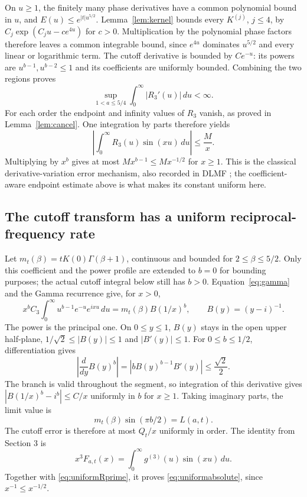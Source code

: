 \documentclass[11pt]{article}
\theoremstyle{remark}\newtheorem{remark}[theorem]{Remark}
\begin{document}
On $u\geq1$, the finitely many phase derivatives have a common
polynomial bound in $u$, and $E(u)\leq e^{|t|u^{5/2}}$.
Lemma~\ref{lem:kernel} bounds every $K^{(j)}$, $j\leq4$, by
$C_j\exp(C_ju-c e^{4u})$ for $c>0$. Multiplication by the
polynomial phase factors therefore leaves a common integrable
bound, since $e^{4u}$ dominates $u^{5/2}$ and every linear or
logarithmic term. The cutoff derivative is bounded by $Ce^{-u}$:
its powers are $u^{b-1},u^{b-2}\leq1$ and its coefficients are
uniformly bounded. Combining the two regions proves
\begin{equation}\label{eq:uniformRprime}
 \sup_{1<a\leq5/4}\int_0^\infty|R_3'(u)|\,du<\infty.
\end{equation}
For each order the endpoint and infinity values of $R_3$ vanish,
as proved in Lemma~\ref{lem:cancel}. One integration by parts
therefore yields
\[
 \left|\int_0^\infty R_3(u)\sin(xu)\,du\right|\leq\frac Mx.
\]
Multiplying by $x^b$ gives at most
$Mx^{b-1}\leq Mx^{-1/2}$ for $x\geq1$.
This is the classical derivative-variation error mechanism, also
recorded in DLMF \cite[\S2.3(i)]{DLMF}; the coefficient-aware
endpoint estimate above is what makes its constant uniform here.

\subsection*{The cutoff transform has a uniform reciprocal-frequency rate}
Let $m_t(\beta)=tK(0)\Gamma(\beta+1)$, continuous and bounded
for $2\leq\beta\leq5/2$. Only this coefficient and the power profile are extended to $b=0$ for bounding purposes; the actual cutoff integral below still has $b>0$. Equation~\eqref{eq:gamma} and the
Gamma recurrence give, for $x>0$,
\[
 x^b C_3\int_0^\infty u^{b-1}e^{-u}e^{ixu}\,du
      =m_t(\beta)B(1/x)^b,\qquad B(y)=(y-i)^{-1}.
\]
The power is the principal one. On $0\leq y\leq1$, $B(y)$
stays in the open upper half-plane, $1/\sqrt2\leq|B(y)|\leq1$
and $|B'(y)|\leq1$. For $0\leq b\leq1/2$, differentiation
gives
\[
 \left|\frac{d}{dy}B(y)^b\right|
      =|b B(y)^{b-1}B'(y)|\leq\frac{\sqrt2}{2}.
\]
The branch is valid throughout the segment, so integration of this
derivative gives $|B(1/x)^b-i^b|\leq C/x$ uniformly in $b$
for $x\geq1$. Taking imaginary parts, the limit value is
\[
 m_t(\beta)\sin(\pi b/2)=L(a,t).
\]
The cutoff error is therefore at most $Q_t/x$ uniformly in order.
The identity from Section 3 is
\[
 x^3F_{a,t}(x)=\int_0^\infty g^{(3)}(u)\sin(xu)\,du.
\]
Together with \eqref{eq:uniformRprime}, it proves
\eqref{eq:uniformabsolute}, since $x^{-1}\leq x^{-1/2}$.
\end{document}
